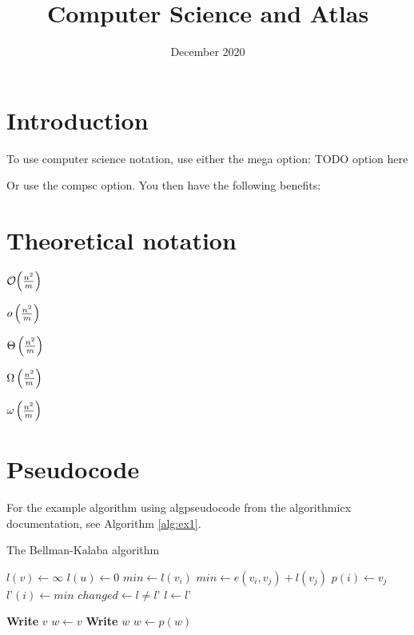 \documentclass[11pt,a4paper]{article}
\title{Computer Science and Atlas}
\date{December 2020}
\begin{document}
\maketitle

\section{Introduction}

To use computer science notation, use either the mega option:
TODO option here

Or use the compsc option. You then have the following benefits:

\section{Theoretical notation}

$\O{\frac{n^2}{m}}$

$o\left(\frac{n^2}{m}\right)$

$\Theta\left(\frac{n^2}{m}\right)$

$\Omega\left(\frac{n^2}{m}\right)$

$\omega\left(\frac{n^2}{m}\right)$

\section{Pseudocode}
For the example algorithm using algpseudocode from the algorithmicx documentation, see Algorithm \ref{alg:ex1}.

\begin{algorithm}
\caption{The Bellman-Kalaba algorithm} \label{alg:ex1}
    \begin{algorithmic}[1]
            \State $l(v) \leftarrow \infty$
        \EndFor
        \State $l(u) \leftarrow 0$
        \Repeat
                \State $min \leftarrow l(v_i)$
                        \State $min \leftarrow e(v_i, v_j) + l(v_j)$
                        \State $p(i) \leftarrow v_j$
                    \EndIf
                \EndFor
                \State $l’(i) \leftarrow min$
            \EndFor
            \State $changed \leftarrow l \not= l’$
            \State $l \leftarrow l’$
    \EndProcedure
    
    \Statex
            \State \textbf{Write} $v$
        \Else
            \State $w \leftarrow v$
                \State \textbf{Write} $w$
                \State $w \leftarrow p(w)$
            \EndWhile
        \EndIf
    \EndProcedure
    \end{algorithmic}
\end{algorithm}
\end{document}
